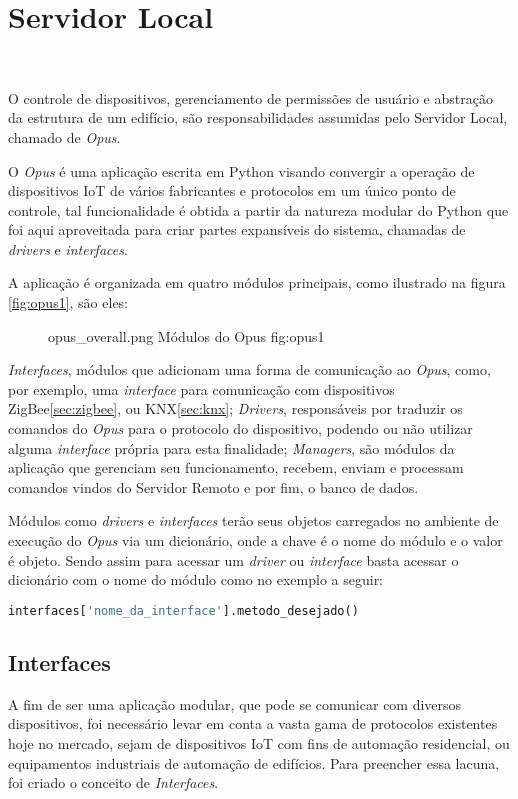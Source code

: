 \section{\textbf{Servidor Local}}
~\label{opus}

O controle de dispositivos, gerenciamento de permissões de usuário e abstração da estrutura de um edifício,
são responsabilidades assumidas pelo Servidor Local, chamado de \emph{Opus}.

O \emph{Opus} é uma aplicação escrita em Python visando convergir a operação de dispositivos IoT de vários
fabricantes e protocolos em um único ponto de controle, tal funcionalidade é obtida a partir da natureza modular
do Python que foi aqui aproveitada para criar partes expansíveis do sistema, chamadas de \emph{drivers} e \emph{interfaces}.

A aplicação é organizada em quatro módulos principais, como ilustrado na figura \ref{fig:opus1}, são eles:
\begin{figure}[h!]
    {opus_overall.png}
    {Módulos do Opus}
    {fig:opus1}
\end{figure}

\emph{Interfaces}, módulos que adicionam uma forma de comunicação ao \emph{Opus}, como, por exemplo, uma \emph{interface} para comunicação com dispositivos ZigBee\ref{sec:zigbee}, ou KNX\ref{sec:knx};
\emph{Drivers}, responsáveis por traduzir os comandos do \emph{Opus} para o protocolo do dispositivo, podendo ou não utilizar alguma \emph{interface} própria para esta finalidade;
\emph{Managers}, são módulos da aplicação que gerenciam seu funcionamento, recebem, enviam e processam comandos vindos do Servidor Remoto e por fim,
o banco de dados.

Módulos como \emph{drivers} e \emph{interfaces} terão seus objetos carregados no ambiente de execução do \emph{Opus}
via um dicionário, onde a chave é o nome do módulo e o valor é objeto.
Sendo assim para acessar um \emph{driver} ou \emph{interface} basta acessar o dicionário com o nome do módulo como no exemplo
a seguir:
\begin{lstlisting}[language=Python]
    interfaces['nome_da_interface'].metodo_desejado()
\end{lstlisting}

\subsection{Interfaces}
A fim de ser uma aplicação modular, que pode se comunicar com diversos dispositivos, foi necessário levar em conta a vasta 
gama de protocolos existentes hoje no mercado, sejam de dispositivos IoT com fins de automação residencial, ou equipamentos industriais
de automação de edifícios. Para preencher essa lacuna, foi criado o conceito de \emph{Interfaces}.

